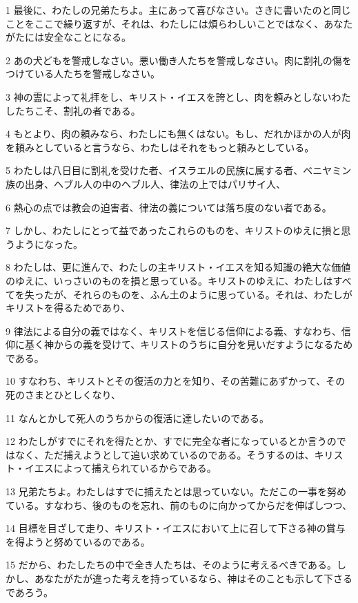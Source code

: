 \par 1 最後に、わたしの兄弟たちよ。主にあって喜びなさい。さきに書いたのと同じことをここで繰り返すが、それは、わたしには煩らわしいことではなく、あなたがたには安全なことになる。
\par 2 あの犬どもを警戒しなさい。悪い働き人たちを警戒しなさい。肉に割礼の傷をつけている人たちを警戒しなさい。
\par 3 神の霊によって礼拝をし、キリスト・イエスを誇とし、肉を頼みとしないわたしたちこそ、割礼の者である。
\par 4 もとより、肉の頼みなら、わたしにも無くはない。もし、だれかほかの人が肉を頼みとしていると言うなら、わたしはそれをもっと頼みとしている。
\par 5 わたしは八日目に割礼を受けた者、イスラエルの民族に属する者、ベニヤミン族の出身、ヘブル人の中のヘブル人、律法の上ではパリサイ人、
\par 6 熱心の点では教会の迫害者、律法の義については落ち度のない者である。
\par 7 しかし、わたしにとって益であったこれらのものを、キリストのゆえに損と思うようになった。
\par 8 わたしは、更に進んで、わたしの主キリスト・イエスを知る知識の絶大な価値のゆえに、いっさいのものを損と思っている。キリストのゆえに、わたしはすべてを失ったが、それらのものを、ふん土のように思っている。それは、わたしがキリストを得るためであり、
\par 9 律法による自分の義ではなく、キリストを信じる信仰による義、すなわち、信仰に基く神からの義を受けて、キリストのうちに自分を見いだすようになるためである。
\par 10 すなわち、キリストとその復活の力とを知り、その苦難にあずかって、その死のさまとひとしくなり、
\par 11 なんとかして死人のうちからの復活に達したいのである。
\par 12 わたしがすでにそれを得たとか、すでに完全な者になっているとか言うのではなく、ただ捕えようとして追い求めているのである。そうするのは、キリスト・イエスによって捕えられているからである。
\par 13 兄弟たちよ。わたしはすでに捕えたとは思っていない。ただこの一事を努めている。すなわち、後のものを忘れ、前のものに向かってからだを伸ばしつつ、
\par 14 目標を目ざして走り、キリスト・イエスにおいて上に召して下さる神の賞与を得ようと努めているのである。
\par 15 だから、わたしたちの中で全き人たちは、そのように考えるべきである。しかし、あなたがたが違った考えを持っているなら、神はそのことも示して下さるであろう。
